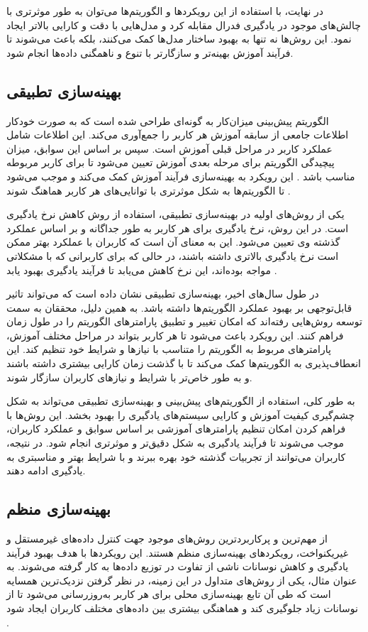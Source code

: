 در نهایت، با استفاده از این رویکردها و الگوریتم‌ها می‌توان به طور موثرتری با چالش‌های موجود در یادگیری فدرال مقابله کرد و مدل‌هایی با دقت و کارایی بالاتر ایجاد نمود. این روش‌ها نه تنها به بهبود ساختار مدل‌ها کمک می‌کنند، بلکه باعث می‌شوند تا فرآیند آموزش بهینه‌تر و سازگارتر با تنوع و ناهمگنی داده‌ها انجام شود.


\subsection{
	بهینه‌سازی تطبیقی%
	\protect
}
الگوریتم پیش‌بینی میزان‌کار به گونه‌ای طراحی شده است که به صورت خودکار اطلاعات جامعی از سابقه آموزش هر کاربر را جمع‌آوری می‌کند. این اطلاعات شامل عملکرد کاربر در مراحل قبلی آموزش است. سپس بر اساس این سوابق، میزان پیچیدگی الگوریتم برای مرحله بعدی آموزش تعیین می‌شود تا برای کاربر مربوطه مناسب باشد . این رویکرد به بهینه‌سازی فرآیند آموزش کمک می‌کند و موجب می‌شود تا الگوریتم‌ها به شکل موثرتری با توانایی‌های هر کاربر هماهنگ شوند
\cite{li2021fedsae}.

یکی از روش‌های اولیه در بهینه‌سازی تطبیقی، استفاده از روش کاهش نرخ یادگیری است. در این روش، نرخ یادگیری برای هر کاربر به طور جداگانه و بر اساس عملکرد گذشته وی تعیین می‌شود. این به معنای آن است که کاربران با عملکرد بهتر ممکن است نرخ یادگیری بالاتری داشته باشند، در حالی که برای کاربرانی که با مشکلاتی مواجه بوده‌اند، این نرخ کاهش می‌یابد تا فرآیند یادگیری بهبود یابد
\cite{reddi2020adaptive}.

در طول سال‌های اخیر، بهینه‌سازی تطبیقی نشان داده است که می‌تواند تاثیر قابل‌توجهی بر بهبود عملکرد الگوریتم‌ها داشته باشد. به همین دلیل، محققان به سمت توسعه روش‌هایی رفته‌اند که امکان تغییر و تطبیق پارامترهای الگوریتم را در طول زمان فراهم کنند. این رویکرد باعث می‌شود تا هر کاربر بتواند در مراحل مختلف آموزش، پارامترهای مربوط به الگوریتم را متناسب با نیازها و شرایط خود تنظیم کند. این انعطاف‌پذیری به الگوریتم‌ها کمک می‌کند تا با گذشت زمان کارایی بیشتری داشته باشند و به طور خاص‌تر با شرایط و نیازهای کاربران سازگار شوند.

به طور کلی، استفاده از الگوریتم‌های پیش‌بینی و بهینه‌سازی تطبیقی می‌تواند به شکل چشم‌گیری کیفیت آموزش و کارایی سیستم‌های یادگیری را بهبود بخشد. این روش‌ها با فراهم کردن امکان تنظیم پارامترهای آموزشی بر اساس سوابق و عملکرد کاربران، موجب می‌شوند تا فرآیند یادگیری به شکل دقیق‌تر و موثرتری انجام شود. در نتیجه، کاربران می‌توانند از تجربیات گذشته خود بهره ببرند و با شرایط بهتر و مناسبتری به یادگیری ادامه دهند.

\subsection{بهینه‌سازی منظم}
از مهم‌ترین و پرکاربردترین روش‌های موجود جهت کنترل داده‌های غیرمستقل و غیریکنواخت، رویکردهای بهینه‌سازی منظم هستند. این رویکردها با هدف بهبود فرآیند یادگیری و کاهش نوسانات ناشی از تفاوت در توزیع داده‌ها به کار گرفته می‌شوند. به عنوان مثال، یکی از روش‌های متداول در این زمینه، در نظر گرفتن نزدیک‌ترین همسایه است که طی آن تابع بهینه‌سازی محلی برای هر کاربر به‌روزرسانی می‌شود تا از نوسانات زیاد جلوگیری کند و هماهنگی بیشتری بین داده‌های مختلف کاربران ایجاد شود
\cite{li2020federatedheteroneneous}.

